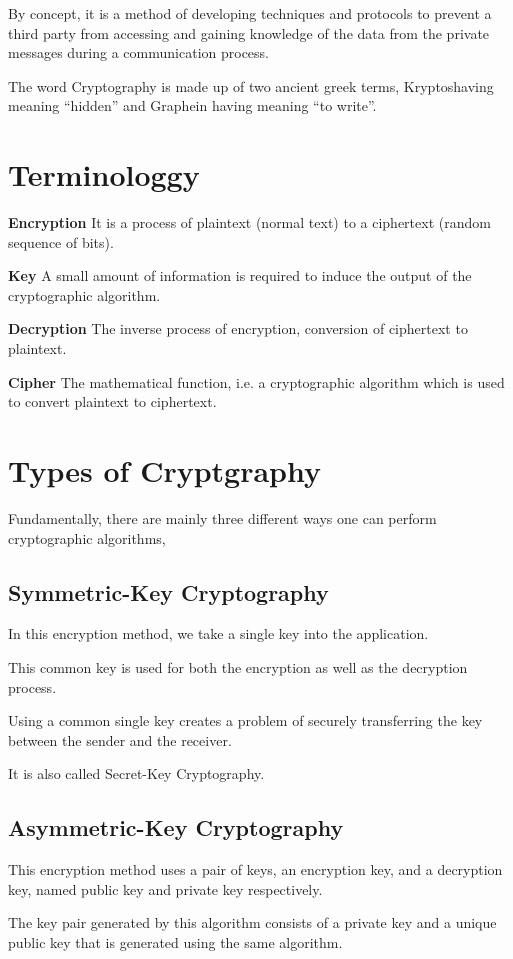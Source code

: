 \documentclass[BTech]{srmuthesis}
\begin{document}
 By concept, it is a method of developing techniques and protocols to prevent a third party from accessing and gaining knowledge of the data from the private messages during a communication process.

 The word Cryptography is made up of two ancient greek terms, Kryptoshaving meaning “hidden” and Graphein having meaning “to write”.
 \section{Terminologgy}
 \textbf{Encryption} It is a process of plaintext (normal text) to a ciphertext (random sequence of bits).

 \textbf{Key} A small amount of information is required to induce the output of the cryptographic algorithm.

 \textbf{Decryption}  The inverse process of encryption, conversion of ciphertext to plaintext.

 \textbf{Cipher} The mathematical function, i.e. a cryptographic algorithm which is used to convert plaintext to ciphertext.

 \section{Types of Cryptgraphy}
 Fundamentally, there are mainly three different ways one can perform cryptographic algorithms,

 \subsection{Symmetric-Key Cryptography}
 In this encryption method, we take a single key into the application.

 This common key is used for both the encryption as well as the decryption process.

 Using a common single key creates a problem of securely transferring the key between the sender and the receiver.

 It is also called Secret-Key Cryptography.

 \subsection{Asymmetric-Key Cryptography}
 This encryption method uses a pair of keys, an encryption key, and a decryption key, named public key and private key respectively.

 The key pair generated by this algorithm consists of a private key and a unique public key that is generated using the same algorithm.
\end{document}
